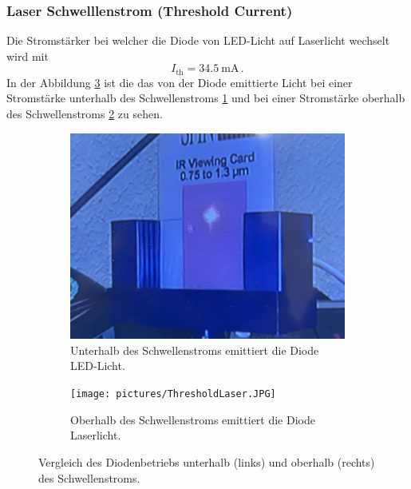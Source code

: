 \subsubsection{Laser Schwelllenstrom (Threshold Current)}
\label{sec:threshold}
Die Stromstärker bei welcher die Diode von LED-Licht auf Laserlicht wechselt wird mit
\begin{equation*}
    I_{\text{th}} = \SI{34.5}{\milli\ampere} \, .
\end{equation*}
In der Abbildung \ref{fig:threshold} ist die das von der Diode emittierte Licht bei einer Stromstärke unterhalb des Schwellenstroms \ref{fig:unterhalb_schwellenstrom}
und bei einer Stromstärke oberhalb des Schwellenstroms \ref{fig:oberhalb_schwellenstrom} zu sehen.
\begin{figure}[H]
    \centering
    \begin{subfigure}{0.45\textwidth}
        \centering
        \includegraphics[width=\textwidth]{pictures/LED.JPG}
        \caption{Unterhalb des Schwellenstroms emittiert die Diode LED-Licht.}
        \label{fig:unterhalb_schwellenstrom}
    \end{subfigure}
    \hfill
    \begin{subfigure}{0.45\textwidth}
        \centering
        \texttt{[image: pictures/ThresholdLaser.JPG]}
        \caption{Oberhalb des Schwellenstroms emittiert die Diode Laserlicht.}
        \label{fig:oberhalb_schwellenstrom}
    \end{subfigure}
    \caption{Vergleich des Diodenbetriebs unterhalb (links) und oberhalb (rechts) des Schwellenstroms.}
    \label{fig:threshold}
\end{figure}

